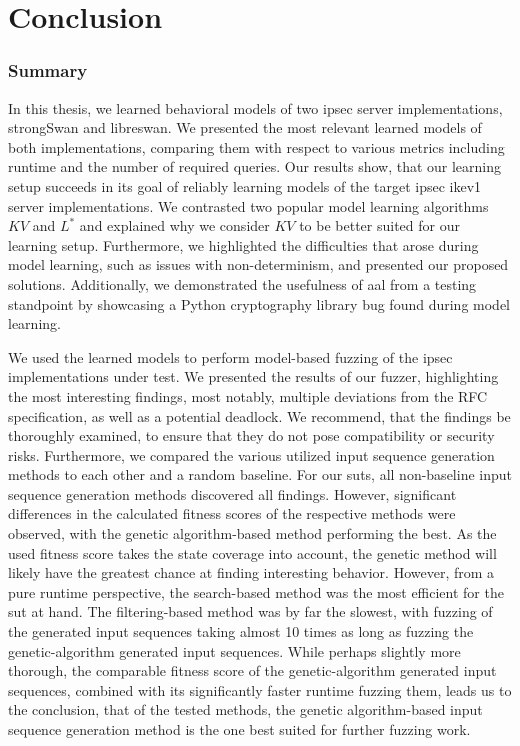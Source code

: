 %
%
% 
% 
% 

\chapter{Conclusion}
\label{chap:Conclusion}

\subsection{Summary}
In this thesis, we learned behavioral models of two \ac{ipsec} server implementations, strongSwan and libreswan. We presented the most relevant learned models of both implementations, comparing them with respect to various metrics including runtime and the number of required queries. Our results show, that our learning setup succeeds in its goal of reliably learning models of the target \ac{ipsec} \ac{ike}v1 server implementations. We contrasted two popular model learning algorithms $KV$ and $L^*$ and explained why we consider $KV$ to be better suited for our learning setup. Furthermore, we highlighted the difficulties that arose during model learning, such as issues with non-determinism, and presented our proposed solutions. Additionally, we demonstrated the usefulness of \ac{aal} from a testing standpoint by showcasing a Python cryptography library bug found during model learning. 

We used the learned models to perform model-based fuzzing of the \ac{ipsec} implementations under test. We presented the results of our fuzzer, highlighting the most interesting findings, most notably, multiple deviations from the RFC specification, as well as a potential deadlock. We recommend, that the findings be thoroughly examined, to ensure that they do not pose compatibility or security risks. Furthermore, we compared the various utilized input sequence generation methods to each other and a random baseline. For our \acp{sut}, all non-baseline input sequence generation methods discovered all findings. However, significant differences in the calculated fitness scores of the respective methods were observed, with the genetic algorithm-based method performing the best. As the used fitness score takes the state coverage into account, the genetic method will likely have the greatest chance at finding interesting behavior. However, from a pure runtime perspective, the search-based method was the most efficient for the \ac{sut} at hand. The filtering-based method was by far the slowest, with fuzzing of the generated input sequences taking almost 10 times as long as fuzzing the genetic-algorithm generated input sequences. While perhaps slightly more thorough, the comparable fitness score of the genetic-algorithm generated input sequences, combined with its significantly faster runtime fuzzing them, leads us to the conclusion, that of the tested methods, the genetic algorithm-based input sequence generation method is the one best suited for further fuzzing work.

